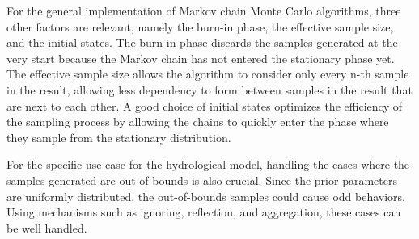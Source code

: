 For the general implementation of Markov chain Monte Carlo algorithms, three other factors are relevant, namely the burn-in phase, the effective sample size, and the initial states. The burn-in phase discards the samples generated at the very start because the Markov chain has not entered the stationary phase yet. The effective sample size allows the algorithm to consider only every n-th sample in the result, allowing less dependency to form between samples in the result that are next to each other. A good choice of initial states optimizes the efficiency of the sampling process by allowing the chains to quickly enter the phase where they sample from the stationary distribution.

For the specific use case for the hydrological model, handling the cases where the samples generated are out of bounds is also crucial. Since the prior parameters are uniformly distributed, the out-of-bounds samples could cause odd behaviors. Using mechanisms such as ignoring, reflection, and aggregation, these cases can be well handled.
